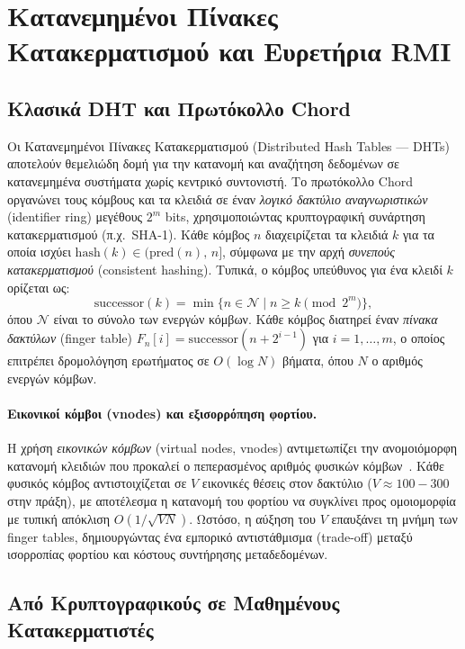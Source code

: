 \section{Κατανεμημένοι Πίνακες Κατακερματισμού και Ευρετήρια RMI}
\label{sec:bg_dht_rmi}

\subsection*{Κλασικά DHT και Πρωτόκολλο Chord}

Οι Κατανεμημένοι Πίνακες Κατακερματισμού (Distributed Hash Tables --- DHTs) αποτελούν θεμελιώδη δομή για την κατανομή και αναζήτηση δεδομένων σε κατανεμημένα συστήματα χωρίς κεντρικό συντονιστή. Το πρωτόκολλο Chord~\cite{stoica2001chord} οργανώνει τους κόμβους και τα κλειδιά σε έναν \textit{λογικό δακτύλιο αναγνωριστικών} (identifier ring) μεγέθους $2^m$ bits, χρησιμοποιώντας κρυπτογραφική συνάρτηση κατακερματισμού (π.χ.\ SHA-1). Κάθε κόμβος $n$ διαχειρίζεται τα κλειδιά $k$ για τα οποία ισχύει $\text{hash}(k) \in (\text{pred}(n),\, n]$, σύμφωνα με την αρχή \textit{συνεπούς κατακερματισμού} (consistent hashing). Τυπικά, ο κόμβος υπεύθυνος για ένα κλειδί $k$ ορίζεται ως:
\begin{equation}
    \text{successor}(k) = \min\{n \in \mathcal{N} \mid n \geq k \pmod{2^m}\},
\end{equation}
όπου $\mathcal{N}$ είναι το σύνολο των ενεργών κόμβων. Κάθε κόμβος διατηρεί έναν \textit{πίνακα δακτύλων} (finger table) $F_n[i] = \text{successor}(n + 2^{i-1})$ για $i = 1, \ldots, m$, ο οποίος επιτρέπει δρομολόγηση ερωτήματος σε $O(\log N)$ βήματα, όπου $N$ ο αριθμός ενεργών κόμβων.

\paragraph{Εικονικοί κόμβοι (vnodes) και εξισορρόπηση φορτίου.}
Η χρήση \textit{εικονικών κόμβων} (virtual nodes, vnodes) αντιμετωπίζει την ανομοιόμορφη κατανομή κλειδιών που προκαλεί ο πεπερασμένος αριθμός φυσικών κόμβων~\cite{stoica2001chord}. Κάθε φυσικός κόμβος αντιστοιχίζεται σε $V$ εικονικές θέσεις στον δακτύλιο ($V \approx 100{-}300$ στην πράξη), με αποτέλεσμα η κατανομή του φορτίου να συγκλίνει προς ομοιομορφία με τυπική απόκλιση $O(1/\sqrt{VN})$. Ωστόσο, η αύξηση του $V$ επαυξάνει τη μνήμη των finger tables, δημιουργώντας ένα εμπορικό αντιστάθμισμα (trade-off) μεταξύ ισορροπίας φορτίου και κόστους συντήρησης μεταδεδομένων.

\subsection*{Από Κρυπτογραφικούς σε Μαθημένους Κατακερματιστές}


